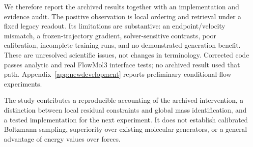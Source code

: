 We therefore report the archived results together with an implementation and evidence audit. The
positive observation is local ordering and retrieval under a fixed legacy readout. Its limitations
are substantive: an endpoint/velocity mismatch, a frozen-trajectory gradient, solver-sensitive
contrasts, poor calibration, incomplete training runs, and no demonstrated generation benefit.
These are unresolved scientific issues, not changes in terminology. Corrected code passes analytic and real FlowMol3 interface tests; no archived result used that
path. Appendix~\ref{app:newdevelopment} reports preliminary conditional-flow experiments.



The study contributes a reproducible accounting of the archived intervention, a distinction between
local residual constraints and global mass identification, and a tested implementation for the next
experiment. It does not establish calibrated Boltzmann sampling, superiority over existing molecular
generators, or a general advantage of energy values over forces.
